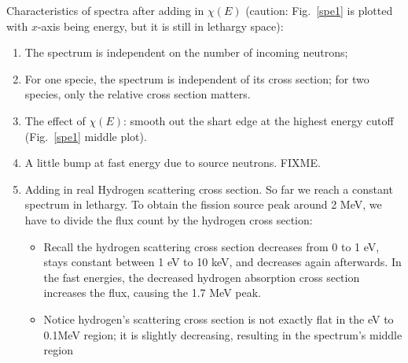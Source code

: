 \documentclass{school-22.211-notes}
\begin{document}
Characteristics of spectra after adding in $\chi(E)$ (caution: Fig.~\ref{spe1} is plotted with $x$-axis being energy, but it is still in lethargy space): 
\begin{enumerate}
\item The spectrum is independent on the number of incoming neutrons; 

\item For one specie, the spectrum is independent of its cross section; for two species, only the relative cross section matters. 

\item The effect of $\chi(E)$: smooth out the shart edge at the highest energy cutoff (Fig.~\ref{spe1} middle plot).

\item A little bump at fast energy due to source neutrons. FIXME. 

\item Adding in real Hydrogen scattering cross section. So far we reach a constant spectrum in lethargy. To obtain the fission source peak around 2 MeV, we have to divide the flux count by the hydrogen cross section:
  \begin{itemize}
  \item Recall the hydrogen scattering cross section decreases from 0 to 1 eV, stays constant between 1 eV to 10 keV, and decreases again afterwards. In the fast energies, the decreased hydrogen absorption cross section increases the flux, causing the 1.7 MeV peak. 
  \item Notice hydrogen's scattering cross section is not exactly flat in the eV to 0.1MeV region; it is slightly decreasing, resulting in the spectrum's middle region 
  \end{itemize}
\end{enumerate}
\end{document}
